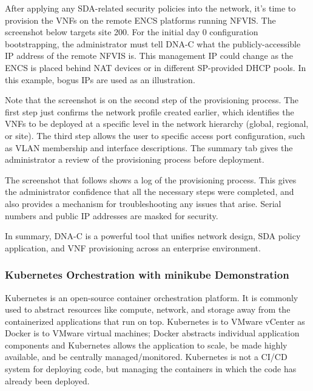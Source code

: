 
After applying any SDA-related security policies into the network, it's time
to provision the VNFs on the remote ENCS platforms running NFVIS\@. The
screenshot below targets site 200. For the initial day 0 configuration
bootstrapping, the administrator must tell DNA-C what the publicly-accessible
IP address of the remote NFVIS is. This management IP could change as the ENCS
is placed behind NAT devices or in different SP-provided DHCP pools. In this
example, bogus IPs are used as an illustration.

Note that the screenshot is on the second step of the provisioning process.
The first step just confirms the network profile created earlier, which
identifies the VNFs to be deployed at a specific level in the network
hierarchy (global, regional, or site). The third step allows the user to
specific access port configuration, such as VLAN membership and interface
descriptions. The summary tab gives the administrator a review of the
provisioning process before deployment.


The screenshot that follows shows a log of the provisioning process. This
gives the administrator confidence that all the necessary steps were
completed, and also provides a mechanism for troubleshooting any issues that
arise. Serial numbers and public IP addresses are masked for security.


In summary, DNA-C is a powerful tool that unifies network design, SDA policy
application, and VNF provisioning across an enterprise environment.

\subsubsection{Kubernetes Orchestration with minikube Demonstration}
Kubernetes is an open-source container orchestration platform. It is commonly
used to abstract resources like compute, network, and storage away from the
containerized applications that run on top. Kubernetes is to VMware vCenter as
Docker is to VMware virtual machines; Docker abstracts individual application
components and Kubernetes allows the application to scale, be made highly
available, and be centrally managed/monitored. Kubernetes is not a CI/CD
system for deploying code, but managing the containers in which the code has
already been deployed.


